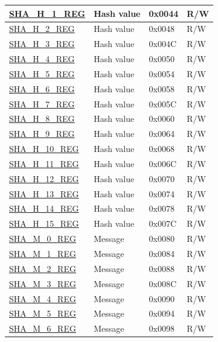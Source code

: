 \begin{longtable}{ | l | l | l |l | }
\hyperref[regdesc:SHAHNREG]{SHA\_H\_1\_REG} & Hash value & 0x0044 & R/W \\ \hline
\hyperref[regdesc:SHAHNREG]{SHA\_H\_2\_REG} & Hash value & 0x0048 & R/W \\ \hline
\hyperref[regdesc:SHAHNREG]{SHA\_H\_3\_REG} & Hash value & 0x004C & R/W \\ \hline
\hyperref[regdesc:SHAHNREG]{SHA\_H\_4\_REG} & Hash value & 0x0050 & R/W \\ \hline
\hyperref[regdesc:SHAHNREG]{SHA\_H\_5\_REG} & Hash value & 0x0054 & R/W \\ \hline
\hyperref[regdesc:SHAHNREG]{SHA\_H\_6\_REG} & Hash value & 0x0058 & R/W \\ \hline
\hyperref[regdesc:SHAHNREG]{SHA\_H\_7\_REG} & Hash value & 0x005C & R/W \\ \hline
\hyperref[regdesc:SHAHNREG]{SHA\_H\_8\_REG} & Hash value & 0x0060 & R/W \\ \hline
\hyperref[regdesc:SHAHNREG]{SHA\_H\_9\_REG} & Hash value & 0x0064 & R/W \\ \hline
\hyperref[regdesc:SHAHNREG]{SHA\_H\_10\_REG} & Hash value & 0x0068 & R/W \\ \hline
\hyperref[regdesc:SHAHNREG]{SHA\_H\_11\_REG} & Hash value & 0x006C & R/W \\ \hline
\hyperref[regdesc:SHAHNREG]{SHA\_H\_12\_REG} & Hash value & 0x0070 & R/W \\ \hline
\hyperref[regdesc:SHAHNREG]{SHA\_H\_13\_REG} & Hash value & 0x0074 & R/W \\ \hline
\hyperref[regdesc:SHAHNREG]{SHA\_H\_14\_REG} & Hash value & 0x0078 & R/W \\ \hline
\hyperref[regdesc:SHAHNREG]{SHA\_H\_15\_REG} & Hash value & 0x007C & R/W \\ \hline
\hyperref[regdesc:SHAMNREG]{SHA\_M\_0\_REG} & Message & 0x0080 & R/W \\ \hline
\hyperref[regdesc:SHAMNREG]{SHA\_M\_1\_REG} & Message & 0x0084 & R/W \\ \hline
\hyperref[regdesc:SHAMNREG]{SHA\_M\_2\_REG} & Message & 0x0088 & R/W \\ \hline
\hyperref[regdesc:SHAMNREG]{SHA\_M\_3\_REG} & Message & 0x008C & R/W \\ \hline
\hyperref[regdesc:SHAMNREG]{SHA\_M\_4\_REG} & Message & 0x0090 & R/W \\ \hline
\hyperref[regdesc:SHAMNREG]{SHA\_M\_5\_REG} & Message & 0x0094 & R/W \\ \hline
\hyperref[regdesc:SHAMNREG]{SHA\_M\_6\_REG} & Message & 0x0098 & R/W \\ \hline

\end{longtable}
